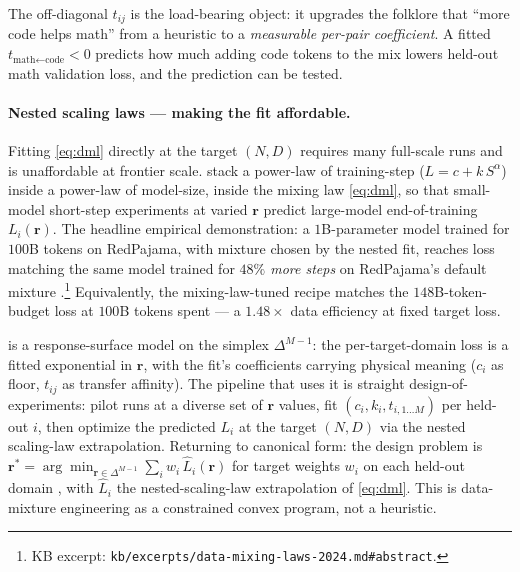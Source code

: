 The off-diagonal $t_{ij}$ is the load-bearing object: it upgrades the
folklore that ``more code helps math'' from a heuristic to a
\emph{measurable per-pair coefficient}. A fitted
$t_{\text{math} \leftarrow \text{code}} < 0$ predicts how much
adding code tokens to the mix lowers held-out math validation loss,
and the prediction can be tested.

\paragraph{Nested scaling laws --- making the fit affordable.}
Fitting \cref{eq:dml} directly at the target $(N, D)$ requires
many full-scale runs and is unaffordable at frontier scale.
\citet[\S 1, \S 2]{data-mixing-laws-2024} stack a power-law of
training-step ($L = c + k\,S^{\alpha}$) inside a power-law of
model-size, inside the mixing law \cref{eq:dml}, so that small-model
short-step experiments at varied $\mathbf{r}$ predict large-model
end-of-training $L_i(\mathbf{r})$. The headline empirical
demonstration: a $1$B-parameter model trained for $100$B tokens on
RedPajama, with mixture chosen by the nested fit, reaches loss
matching the same model trained for \emph{$48\%$ more steps} on
RedPajama's default mixture
\citep[abstract]{data-mixing-laws-2024}.\footnote{KB excerpt:
\texttt{kb/excerpts/data-mixing-laws-2024.md\#abstract}.} Equivalently,
the mixing-law-tuned recipe matches the $148$B-token-budget loss at
$100$B tokens spent --- a $1.48\times$ data efficiency at fixed
target loss.

\begin{analogy}
\label{analogy:dml-as-response-surface}
 is a response-surface model on the simplex
$\Delta^{M-1}$: the per-target-domain loss is a fitted exponential
in $\mathbf{r}$, with the fit's coefficients carrying physical
meaning ($c_i$ as floor, $t_{ij}$ as transfer affinity). The pipeline
that uses it is straight design-of-experiments: pilot runs at a
diverse set of $\mathbf{r}$ values, fit $(c_i, k_i, t_{i, 1\ldots
M})$ per held-out $i$, then optimize the predicted $L_i$ at the
target $(N, D)$ via the nested scaling-law extrapolation. Returning
to canonical form: the design problem is
$\mathbf{r}^* = \arg\min_{\mathbf{r} \in \Delta^{M-1}}
\sum_i w_i\,\hat{L}_i(\mathbf{r})$ for target weights $w_i$ on each
held-out domain \citep[\S 2, eq.\ 5]{data-mixing-laws-2024}, with
$\hat{L}_i$ the nested-scaling-law extrapolation of \cref{eq:dml}.
This is data-mixture engineering as a constrained convex program,
not a heuristic.
\end{analogy}

